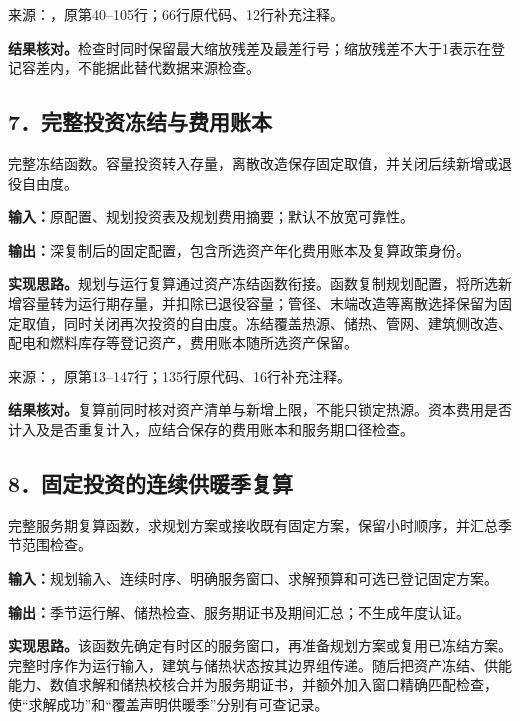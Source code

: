{\small 来源：，原第40--105行；66行原代码、12行补充注释。}\par

\begingroup
{}

\endgroup

\noindent\textbf{结果核对。}检查时同时保留最大缩放残差及最差行号；缩放残差不大于1表示在登记容差内，不能据此替代数据来源检查。

\subsection*{7．完整投资冻结与费用账本}
完整冻结函数。容量投资转入存量，离散改造保存固定取值，并关闭后续新增或退役自由度。

\noindent\textbf{输入：}原配置、规划投资表及规划费用摘要；默认不放宽可靠性。\par
\noindent\textbf{输出：}深复制后的固定配置，包含所选资产年化费用账本及复算政策身份。\par

\noindent\textbf{实现思路。}规划与运行复算通过资产冻结函数衔接。函数复制规划配置，将所选新增容量转为运行期存量，并扣除已退役容量；管径、末端改造等离散选择保留为固定取值，同时关闭再次投资的自由度。冻结覆盖热源、储热、管网、建筑侧改造、配电和燃料库存等登记资产，费用账本随所选资产保留。

{\small 来源：，原第13--147行；135行原代码、16行补充注释。}\par

\begingroup
{}

\endgroup

\noindent\textbf{结果核对。}复算前同时核对资产清单与新增上限，不能只锁定热源。资本费用是否计入及是否重复计入，应结合保存的费用账本和服务期口径检查。

\subsection*{8．固定投资的连续供暖季复算}
完整服务期复算函数，求规划方案或接收既有固定方案，保留小时顺序，并汇总季节范围检查。

\noindent\textbf{输入：}规划输入、连续时序、明确服务窗口、求解预算和可选已登记固定方案。\par
\noindent\textbf{输出：}季节运行解、储热检查、服务期证书及期间汇总；不生成年度认证。\par

\noindent\textbf{实现思路。}该函数先确定有时区的服务窗口，再准备规划方案或复用已冻结方案。完整时序作为运行输入，建筑与储热状态按其边界组传递。随后把资产冻结、供能能力、数值求解和储热校核合并为服务期证书，并额外加入窗口精确匹配检查，使“求解成功”和“覆盖声明供暖季”分别有可查记录。

